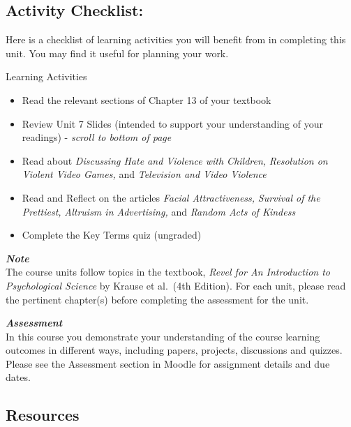 \documentclass[
]{book}
\providecommand{\tightlist}{%
  \setlength{\itemsep}{0pt}\setlength{\parskip}{0pt}}
\begin{document}
\hypertarget{activity-checklist-6}{%
\subsection*{Activity Checklist:}\label{activity-checklist-6}}

Here is a checklist of learning activities you will benefit from in completing this unit. You may find it useful for planning your work.

\begin{reflect}
{Learning Activities}

\begin{itemize}
\tightlist
\item
  Read the relevant sections of Chapter 13 of your textbook
\item
  Review Unit 7 Slides (intended to support your understanding of your readings) - \emph{scroll to bottom of page}
\item
  Read about \emph{Discussing Hate and Violence with Children,} \emph{Resolution on Violent Video Games,} and \emph{Television and Video Violence}\\
\item
  Read and Reflect on the articles \emph{Facial Attractiveness,} \emph{Survival of the Prettiest,} \emph{Altruism in Advertising,} and \emph{Random Acts of Kindess}
\item
  Complete the Key Terms quiz (ungraded)
\end{itemize}
\end{reflect}

\begin{caution}
\textbf{\emph{Note}}\\
The course units follow topics in the textbook, \emph{Revel for An Introduction to Psychological Science} by Krause et al.~(4th Edition). For each unit, please read the pertinent chapter(s) before completing the assessment for the unit.
\end{caution}

\begin{assessment}
\textbf{\emph{Assessment}}\\
In this course you demonstrate your understanding of the course learning outcomes in different ways, including papers, projects, discussions and quizzes. Please see the Assessment section in Moodle for assignment details and due dates.
\end{assessment}

\hypertarget{resources-6}{%
\subsection*{Resources}\label{resources-6}}
\end{document}
